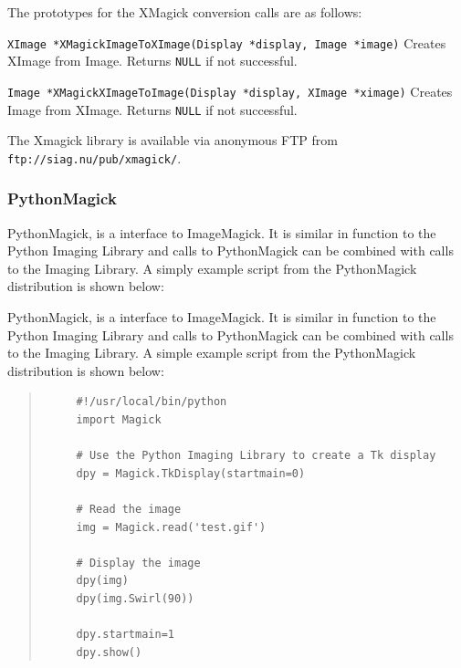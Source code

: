 \documentclass[twoside,11pt]{article}
\newcommand{\htmladdnormallink}[2]{#1}
\newcommand{\htmlref}[2]{#1}
\begin{document}
The prototypes for the XMagick conversion calls are as follows:

\begin{description}
\item {\tt XImage *XMagickImageToXImage(Display *display, Image *image)}\linebreak
Creates XImage from Image. Returns {\tt NULL} if not successful.
\item{\tt Image *XMagickXImageToImage(Display *display, XImage *ximage)}\linebreak
Creates Image from XImage. Returns {\tt NULL} if not successful.
\end{description}

The Xmagick library is available via anonymous FTP from  \htmladdnormallink{{\tt ftp://siag.nu/pub/xmagick/}}{ftp://siag.nu/pub/xmagick/}.

\subsubsection{PythonMagick}

\htmladdnormallink{PythonMagick}{http://starship.python.net/crew/zack/pymagick/}, is a interface to \htmlref{ImageMagick}{sc15_magick}. It is similar in function to the \htmlref{Python Imaging Library}{sc15_pythonimg} and calls to PythonMagick can be combined with calls to the Imaging Library. A simply example script from the PythonMagick distribution is shown below:

PythonMagick, is a interface to \htmlref{ImageMagick}{sc15_magick}. It is similar in function to the \htmlref{Python Imaging Library}{sc15_pythonimg} and calls to PythonMagick can be combined with calls to the Imaging Library. A simple example script from the PythonMagick distribution is shown below:


\small
\begin{quote}
\begin{verbatim}
     #!/usr/local/bin/python
     import Magick

     # Use the Python Imaging Library to create a Tk display
     dpy = Magick.TkDisplay(startmain=0)

     # Read the image
     img = Magick.read('test.gif')

     # Display the image
     dpy(img)
     dpy(img.Swirl(90))

     dpy.startmain=1
     dpy.show()
\end{verbatim}
\end{quote}
\normalsize
\end{document}

